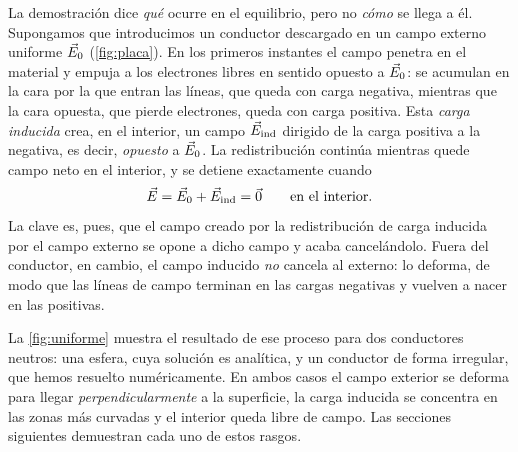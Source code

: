 La demostración dice \emph{qué} ocurre en el equilibrio, pero no \emph{cómo} se llega a él. Supongamos que introducimos un conductor
descargado en un campo externo uniforme $\vec{E}_0$ (\cref{fig:placa}). En los primeros instantes el campo penetra en el material y empuja a los
electrones libres en sentido opuesto a $\vec{E}_0$: se acumulan en la cara por la que entran las líneas, que queda con carga negativa, mientras
que la cara opuesta, que pierde electrones, queda con carga positiva. Esta \emph{carga inducida} crea, en el interior, un campo $\vec{E}_{\mathrm{ind}}$
dirigido de la carga positiva a la negativa, es decir, \emph{opuesto} a $\vec{E}_0$. La redistribución continúa mientras quede campo neto en el
interior, y se detiene exactamente cuando
\[
  \vec{E}=\vec{E}_0+\vec{E}_{\mathrm{ind}}=\vec{0}\qquad\text{en el interior.}
\]
La clave es, pues, que el campo creado por la redistribución de carga inducida por el campo externo se opone a dicho campo y acaba
cancelándolo. Fuera del conductor, en cambio, el campo inducido \emph{no} cancela al externo: lo deforma, de modo que las líneas de campo
terminan en las cargas negativas y vuelven a nacer en las positivas.



La \cref{fig:uniforme} muestra el resultado de ese proceso para dos conductores neutros: una esfera, cuya solución es analítica, y un
conductor de forma irregular, que hemos resuelto numéricamente. En ambos casos el campo exterior se deforma para llegar
\emph{perpendicularmente} a la superficie, la carga inducida se concentra en las zonas más curvadas y el interior queda libre de campo.
Las secciones siguientes demuestran cada uno de estos rasgos.



